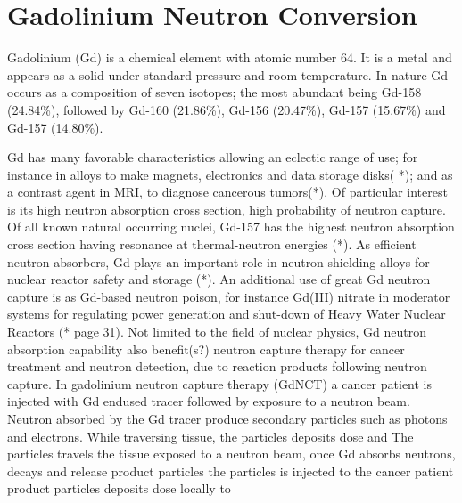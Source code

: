 \chapter{Gadolinium Neutron Conversion}


Gadolinium (Gd) is a chemical element with atomic number 64. It is a metal and appears as a solid under standard pressure and room temperature. In nature Gd occurs as a composition of seven isotopes; the most abundant being Gd-158 (24.84\%), followed by Gd-160 (21.86\%), Gd-156 (20.47\%), Gd-157 (15.67\%) and Gd-157 (14.80\%).

Gd has many favorable characteristics allowing an eclectic range of use; for instance in alloys to make magnets, electronics and data storage disks( *); and as a contrast agent in MRI, to diagnose cancerous tumors(*).
Of particular interest is its high neutron absorption cross section, high probability of neutron capture. Of all known natural occurring nuclei, Gd-157 has the highest neutron absorption cross section having resonance at thermal-neutron energies (*). As efficient neutron absorbers, Gd plays an important role in neutron shielding alloys for nuclear reactor safety and storage (*). An additional use of great Gd neutron capture is as Gd-based neutron poison, for instance Gd(III) nitrate in moderator systems for regulating power generation and shut-down of Heavy Water Nuclear Reactors (* page 31).
Not limited to the field of nuclear physics, Gd neutron absorption capability also benefit(s?) neutron capture therapy for cancer treatment and neutron detection, due to reaction products following neutron capture.  In gadolinium neutron capture therapy (GdNCT) a cancer patient is injected with Gd endused tracer followed by exposure to a neutron beam. Neutron absorbed by the Gd tracer produce secondary particles such as photons and electrons. While traversing tissue, the particles deposits dose and The particles travels the tissue exposed to a neutron beam, once Gd absorbs neutrons, decays and release product particles the particles  is injected to the cancer patient product particles deposits dose locally to

